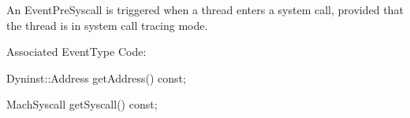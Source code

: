 
An EventPreSyscall is triggered when a thread enters a system call, provided
that the thread is in system call tracing mode.

Associated EventType Code: 

\begin{apient}
Dyninst::Address getAddress() const;
\end{apient}


\begin{apient}
MachSyscall getSyscall() const;
\end{apient}

